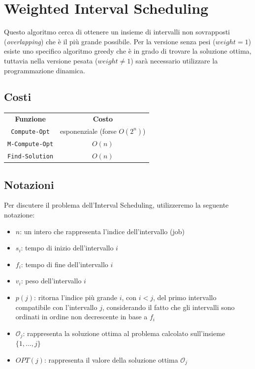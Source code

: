 \chapter{Weighted Interval Scheduling}

Questo algoritmo cerca di ottenere un insieme di intervalli non sovrapposti
(\textit{overlapping}) che è il più grande possibile. Per la versione senza pesi
($weight = 1$) esiste uno specifico algoritmo greedy che è in grado di trovare la
soluzione ottima, tuttavia nella versione pesata ($weight \neq 1$) sarà
necessario utilizzare la programmazione dinamica.

\section{Costi}

\begin{center}
    \begin{tabular}{|c|c|}
        \textbf{Funzione}    & \textbf{Costo}                \\
        \verb|Compute-Opt|   & esponenziale (forse $O(2^n)$) \\
        \verb|M-Compute-Opt| & $O(n)$                        \\
        \verb|Find-Solution| & $O(n)$
    \end{tabular}
\end{center}

\section{Notazioni}

Per discutere il problema dell'Interval Scheduling, utilizzeremo la seguente
notazione:

\begin{itemize}
    \item $n$: un intero che rappresenta l'indice dell'intervallo (job)
    \item $s_i$: tempo di inizio dell'intervallo $i$
    \item $f_i$: tempo di fine dell'intervallo $i$
    \item $v_i$: peso dell'intervallo $i$
    \item $p(j)$: ritorna l'indice più grande $i$, con $i < j$, del primo
          intervallo compatibile con l'intervallo $j$, considerando il fatto che gli
          intervalli sono ordinati in ordine non decrescente in base a $f_i$
    \item $\mathcal{O}_j$: rappresenta la soluzione ottima al problema calcolato
          sull'insieme $\{1, \ldots, j\}$
    \item $OPT(j)$: rappresenta il valore della soluzione ottima $\mathcal{O}_j$
\end{itemize}

